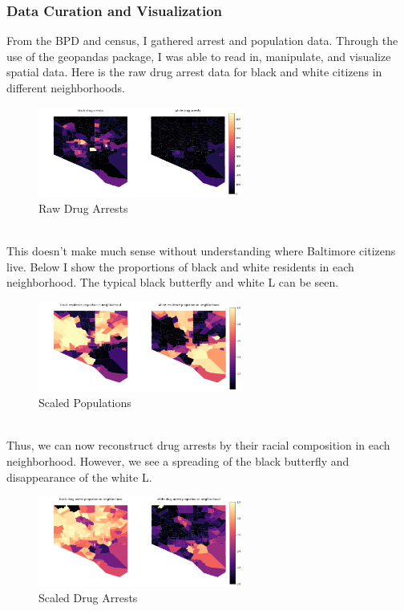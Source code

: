 \documentclass[10pt]{article}
\begin{document}
\subsubsection{Data Curation and Visualization}
From the BPD and census, I gathered arrest and population data. Through the use of the geopandas package, I was able to read in, manipulate, and visualize spatial data. Here is the raw drug arrest data for black and white citizens in different neighborhoods.   \begin{figure}[!htb]
    \begin{minipage}{\textwidth}
     \caption{Raw Drug Arrests}
     \centering
     \includegraphics[width=0.6\textwidth]{imgs/rawdrug.png}
   \end{minipage}\hfill
 \end{figure}\\
 This doesn't make much sense without understanding where Baltimore citizens live. Below I show the proportions of black and white residents in each neighborhood. The typical black butterfly and white L can be seen.
   \begin{figure}[!htb]
    \begin{minipage}{\textwidth}
     \caption{Scaled Populations}
     \centering
     \includegraphics[width=0.6\textwidth]{imgs/scalelive.png}
   \end{minipage}\hfill
 \end{figure}\\
 Thus, we can now reconstruct drug arrests by their racial composition in each neighborhood. However, we see a spreading of the black butterfly and disappearance of the white L. 
    \begin{figure}[!htb]
    \begin{minipage}{\textwidth}
     \caption{Scaled Drug Arrests}
     \centering
     \includegraphics[width=0.6\textwidth]{imgs/scaledrug.png}
   \end{minipage}\hfill
 \end{figure}\\
\end{document}
